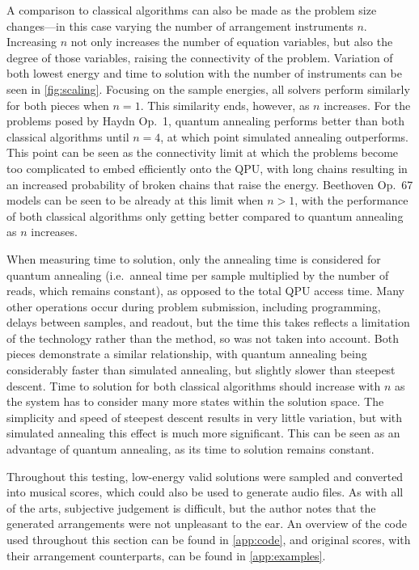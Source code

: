 \documentclass[12pt]{article}
\theoremstyle{definition}
\begin{document}
A comparison to classical algorithms can also be made as the problem size changes---in this case varying the number of arrangement instruments $n$. Increasing $n$ not only increases the number of equation variables, but also the degree of those variables, raising the connectivity of the problem. Variation of both lowest energy and time to solution with the number of instruments can be seen in \cref{fig:scaling}. Focusing on the sample energies, all solvers perform similarly for both pieces when $n=1$. This similarity ends, however, as $n$ increases. For the problems posed by Haydn Op.\ 1, quantum annealing performs better than both classical algorithms until $n=4$, at which point simulated annealing outperforms. This point can be seen as the connectivity limit at which the problems become too complicated to embed efficiently onto the QPU, with long chains resulting in an increased probability of broken chains that raise the energy. Beethoven Op.\ 67 models can be seen to be already at this limit when $n>1$, with the performance of both classical algorithms only getting better compared to quantum annealing as $n$ increases.

When measuring time to solution, only the annealing time is considered for quantum annealing (i.e.\ anneal time per sample multiplied by the number of reads, which remains constant), as opposed to the total QPU access time. Many other operations occur during problem submission, including programming, delays between samples, and readout, but the time this takes reflects a limitation of the technology rather than the method, so was not taken into account. Both pieces demonstrate a similar relationship, with quantum annealing being considerably faster than simulated annealing, but slightly slower than steepest descent. Time to solution for both classical algorithms should increase with $n$ as the system has to consider many more states within the solution space. The simplicity and speed of steepest descent results in very little variation, but with simulated annealing this effect is much more significant. This can be seen as an advantage of quantum annealing, as its time to solution remains constant.

Throughout this testing, low-energy valid solutions were sampled and converted into musical scores, which could also be used to generate audio files. As with all of the arts, subjective judgement is difficult, but the author notes that the generated arrangements were not unpleasant to the ear.
An overview of the code used throughout this section can be found in \cref{app:code}, and original scores, with their arrangement counterparts, can be found in \cref{app:examples}.
\end{document}
